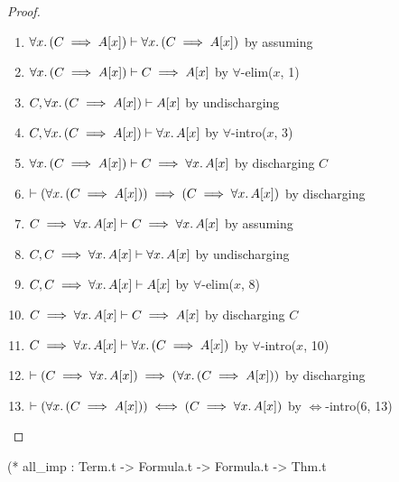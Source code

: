 \begin{proof}
\begin{enumerate}
\item $\forall x\ldotp(C\implies A[x])\vdash\forall x\ldotp(C\implies A[x])$
by assuming%
\item $\forall x\ldotp(C\implies A[x])\vdash C\implies A[x]$
  by $\forall$-elim($x$, 1)%
\item $C,\forall x\ldotp(C\implies A[x])\vdash A[x]$
  by undischarging%
\item $C,\forall x\ldotp(C\implies A[x])\vdash\forall x\ldotp A[x]$
  by $\forall$-intro($x$, 3)%
\item $\forall x\ldotp(C\implies A[x])\vdash C\implies\forall x\ldotp A[x]$
  by discharging $C$%
\item $\vdash(\forall x\ldotp(C\implies A[x]))\implies(C\implies\forall x\ldotp A[x])$
  by discharging%
\item $C\implies\forall x\ldotp A[x]\vdash C\implies\forall x\ldotp A[x]$
  by assuming%
\item $C,C\implies\forall x\ldotp A[x]\vdash\forall x\ldotp A[x]$
  by undischarging%
\item $C,C\implies\forall x\ldotp A[x]\vdash A[x]$
  by $\forall$-elim($x$, 8)%
\item $C\implies\forall x\ldotp A[x]\vdash C\implies A[x]$
  by discharging $C$%
\item $C\implies\forall x\ldotp A[x]\vdash\forall x\ldotp(C\implies A[x])$
  by $\forall$-intro($x$, 10)%
\item $\vdash(C\implies\forall x\ldotp A[x])\implies(\forall x\ldotp(C\implies A[x]))$
  by discharging%
\item $\vdash(\forall x\ldotp(C\implies A[x]))\iff(C\implies\forall x\ldotp A[x])$
  by $\Leftrightarrow$-intro(6, 13)\qedhere%
\end{enumerate}
\end{proof}

\nwenddocs{}\plusendmoddef\nwstartdeflinemarkup{}\nwenddeflinemarkup
(* all_imp : Term.t -> Formula.t -> Formula.t -> Thm.t

